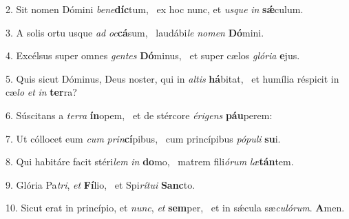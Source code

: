 2. Sit nomen Dómini \textit{be}\textit{ne}\textbf{díc}tum, \ast\  ex hoc nunc, et \textit{us}\textit{que} \textit{in} \textbf{sǽ}culum.\

3. A solis ortu usque \textit{ad} \textit{oc}\textbf{cá}sum, \ast\  laudábi\textit{le} \textit{no}\textit{men} \textbf{Dó}mini.\

4. Excélsus super omnes \textit{gen}\textit{tes} \textbf{Dó}minus, \ast\  et super cælos \textit{gló}\textit{ri}\textit{a} \textbf{e}jus.\

5. Quis sicut Dóminus, Deus noster, qui in \textit{al}\textit{tis} \textbf{há}bitat, \ast\  et humília réspicit in cæ\textit{lo} \textit{et} \textit{in} \textbf{ter}ra?\

6. Súscitans a \textit{ter}\textit{ra} \textbf{ín}opem, \ast\  et de stércore \textit{é}\textit{ri}\textit{gens} \textbf{páu}perem:\

7. Ut cóllocet eum \textit{cum} \textit{prin}\textbf{cí}pibus, \ast\  cum princípibus \textit{pó}\textit{pu}\textit{li} \textbf{su}i.\

8. Qui habitáre facit stéri\textit{lem} \textit{in} \textbf{do}mo, \ast\  matrem fili\textit{ó}\textit{rum} \textit{læ}\textbf{tán}tem.\

9. Glória Pa\textit{tri}, \textit{et} \textbf{Fí}lio, \ast\  et Spi\textit{rí}\textit{tu}\textit{i} \textbf{Sanc}to.\

10. Sicut erat in princípio, et \textit{nunc}, \textit{et} \textbf{sem}per, \ast\  et in sǽcula sæ\textit{cu}\textit{ló}\textit{rum}. \textbf{A}men.\

